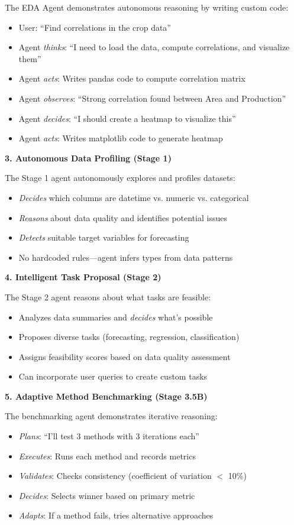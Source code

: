 \documentclass[11pt,a4paper]{article}
\begin{document}
The EDA Agent demonstrates autonomous reasoning by writing custom code:
\begin{itemize}
    \item User: ``Find correlations in the crop data''
    \item Agent \textit{thinks}: ``I need to load the data, compute correlations, and visualize them''
    \item Agent \textit{acts}: Writes pandas code to compute correlation matrix
    \item Agent \textit{observes}: ``Strong correlation found between Area and Production''
    \item Agent \textit{decides}: ``I should create a heatmap to visualize this''
    \item Agent \textit{acts}: Writes matplotlib code to generate heatmap
\end{itemize}

\textbf{3. Autonomous Data Profiling (Stage 1)}

The Stage 1 agent autonomously explores and profiles datasets:
\begin{itemize}
    \item \textit{Decides} which columns are datetime vs. numeric vs. categorical
    \item \textit{Reasons} about data quality and identifies potential issues
    \item \textit{Detects} suitable target variables for forecasting
    \item No hardcoded rules---agent infers types from data patterns
\end{itemize}

\textbf{4. Intelligent Task Proposal (Stage 2)}

The Stage 2 agent reasons about what tasks are feasible:
\begin{itemize}
    \item Analyzes data summaries and \textit{decides} what's possible
    \item Proposes diverse tasks (forecasting, regression, classification)
    \item Assigns feasibility scores based on data quality assessment
    \item Can incorporate user queries to create custom tasks
\end{itemize}

\textbf{5. Adaptive Method Benchmarking (Stage 3.5B)}

The benchmarking agent demonstrates iterative reasoning:
\begin{itemize}
    \item \textit{Plans}: ``I'll test 3 methods with 3 iterations each''
    \item \textit{Executes}: Runs each method and records metrics
    \item \textit{Validates}: Checks consistency (coefficient of variation $<$ 10\%)
    \item \textit{Decides}: Selects winner based on primary metric
    \item \textit{Adapts}: If a method fails, tries alternative approaches
\end{itemize}
\end{document}
